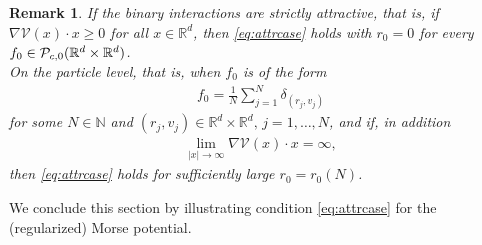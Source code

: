 \documentclass[11pt]{article}
\newtheorem*{remark}{Remark}
\newcommand{\R}[0]{\mathbb R}
\newcommand{\N}[0]{\mathbb N}
\newcommand{\masssum}[2]{ \frac{1}{#2} \sum_{#1 = 1}^{#2}  }
\newcommand{\abs}[1]{\left| #1 \right|}
\newcommand{\Ppo}[1]{
    \ifx #1\infty
        \mathcal{P}_{c,0}
    \else 
        \mathcal{P}_{#1,0}
    \fi 
}
\begin{document}
\begin{bibunit}[unsrtnat]
     \begin{remark}
         If the binary interactions are strictly attractive, that is, if $\nabla \mathcal{V}(x) \cdot x \geq 0$ for all $x \in \R^d $, then \eqref{eq:attrcase} holds with $r_0 = 0$ for every $f_0 \in \Ppo{\infty}(\R^d \times \R^d)$. \\
        On the particle level, that is, when $f_0$ is of the form 
            \begin{align*}
                f_0 = \masssum{j}{N} \delta_{(r_j, v_j)}
            \end{align*}
            for some $N \in \N$ and $(r_j, v_j) \in \R^d \times \R^d, \, j = 1, \ldots, N$, and if, in addition
            \begin{align*}
                \lim\limits_{\abs{x} \to \infty} \nabla \mathcal{V}(x) \cdot x = \infty,
            \end{align*}
             then \eqref{eq:attrcase} holds for sufficiently large $r_0 = r_0(N)$.
    \end{remark}

    We conclude this section by illustrating condition \eqref{eq:attrcase} for the (regularized) Morse potential.
    

\end{bibunit}
\end{document}
